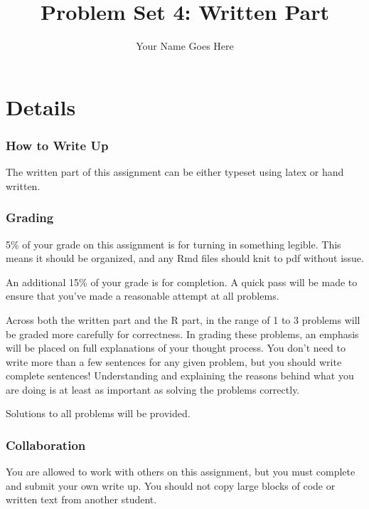 \documentclass[]{article}
\title{Problem Set 4: Written Part}
\author{Your Name Goes Here}
\date{}
\begin{document}
\maketitle

\def\simiid{\stackrel{{\mbox{\text{\tiny i.i.d.}}}}{\sim}}

\hypertarget{details}{%
\section{Details}\label{details}}

\hypertarget{how-to-write-up}{%
\subsubsection{How to Write Up}\label{how-to-write-up}}

The written part of this assignment can be either typeset using latex or
hand written.

\hypertarget{grading}{%
\subsubsection{Grading}\label{grading}}

5\% of your grade on this assignment is for turning in something
legible. This means it should be organized, and any Rmd files should
knit to pdf without issue.

An additional 15\% of your grade is for completion. A quick pass will be
made to ensure that you've made a reasonable attempt at all problems.

Across both the written part and the R part, in the range of 1 to 3
problems will be graded more carefully for correctness. In grading these
problems, an emphasis will be placed on full explanations of your
thought process. You don't need to write more than a few sentences for
any given problem, but you should write complete sentences!
Understanding and explaining the reasons behind what you are doing is at
least as important as solving the problems correctly.

Solutions to all problems will be provided.

\hypertarget{collaboration}{%
\subsubsection{Collaboration}\label{collaboration}}

You are allowed to work with others on this assignment, but you must
complete and submit your own write up. You should not copy large blocks
of code or written text from another student.
\end{document}

